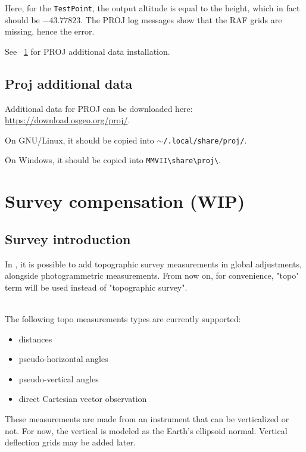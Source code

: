 Here, for the {\tt TestPoint}, the output altitude is equal to the height, which in fact should be $-43.77823$.
The PROJ log messages show that the RAF grids are missing, hence the error.

See ~\ref{ProjData} for PROJ additional data installation.


\section{Proj additional data}
\label{ProjData}
Additional data for PROJ can be downloaded here: \url{https://download.osgeo.org/proj/}.

On GNU/Linux, it should be copied into $\sim${\tt /.local/share/proj/}.

On Windows, it should be copied into {\tt MMVII\textbackslash share\textbackslash proj\textbackslash}.




\chapter{Survey compensation (WIP)}
\label{Chap:TopoUser}


\section{Survey introduction}

In \CdPPP, it is possible to add topographic survey measurements in global adjustments, alongside photogrammetric measurements. From now on, for convenience, "topo" term will be used instead of "topographic survey".
\\\

The following topo measurements types are currently supported:

\begin{itemize}
    \item distances
    \item pseudo-horizontal angles
    \item pseudo-vertical angles
    \item direct Cartesian vector observation
\end{itemize}

These measurements are made from an instrument that can be verticalized or not.
For now, the vertical is modeled as the Earth's ellipsoid normal. Vertical deflection grids may be added later.

